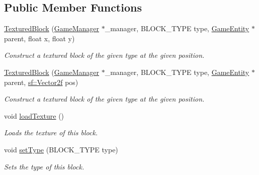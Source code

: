 \subsection*{Public Member Functions}
\begin{DoxyCompactItemize}
\item 
\mbox{\hyperlink{class_textured_block_a067f51d1fac16ea8610cc76a488dd976}{Textured\+Block}} (\mbox{\hyperlink{class_game_manager}{Game\+Manager}} $\ast$\+\_\+manager, B\+L\+O\+C\+K\+\_\+\+T\+Y\+PE type, \mbox{\hyperlink{class_game_entity}{Game\+Entity}} $\ast$parent, float x, float y)
\begin{DoxyCompactList}\small\item\em Construct a textured block of the given type at the given position. \end{DoxyCompactList}\item 
\mbox{\hyperlink{class_textured_block_a93cb4f799f831c5ddb9122554b6844eb}{Textured\+Block}} (\mbox{\hyperlink{class_game_manager}{Game\+Manager}} $\ast$\+\_\+manager, B\+L\+O\+C\+K\+\_\+\+T\+Y\+PE type, \mbox{\hyperlink{class_game_entity}{Game\+Entity}} $\ast$parent, \mbox{\hyperlink{classsf_1_1_vector2}{sf\+::\+Vector2f}} pos)
\begin{DoxyCompactList}\small\item\em Construct a textured block of the given type at the given position. \end{DoxyCompactList}\item 
\mbox{\label{class_textured_block_acdcd9bb3ce6d067c44e82d92344eb90b}} 
void \mbox{\hyperlink{class_textured_block_acdcd9bb3ce6d067c44e82d92344eb90b}{load\+Texture}} ()
\begin{DoxyCompactList}\small\item\em Loads the texture of this block. \end{DoxyCompactList}\item 
\mbox{\label{class_textured_block_a2f5cd07b71126cce74f655e85000c50f}} 
void \mbox{\hyperlink{class_textured_block_a2f5cd07b71126cce74f655e85000c50f}{set\+Type}} (B\+L\+O\+C\+K\+\_\+\+T\+Y\+PE type)
\begin{DoxyCompactList}\small\item\em Sets the type of this block. \end{DoxyCompactList}\item 
\mbox{\label{class_textured_block_a22e6287e0876e90699c0f1f4f59f7d8e}} 

\end{DoxyCompactItemize}
